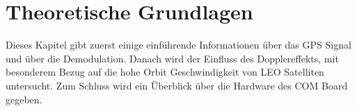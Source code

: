 \chapter{Theoretische Grundlagen}
Dieses Kapitel gibt zuerst einige einführende Informationen über das GPS Signal und über die Demodulation. Danach wird der Einfluss des Dopplereffekts, mit besonderem Bezug auf die hohe Orbit Geschwindigkeit von \gls{LEO} Satelliten untersucht. Zum Schluss wird ein Überblick über die Hardware des COM Board gegeben.









